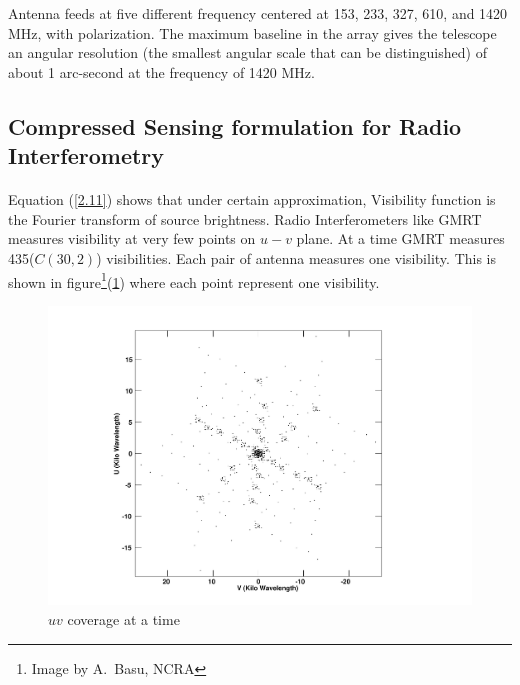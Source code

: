 Antenna feeds at five different frequency centered at 153, 233, 327, 610, and 1420 MHz, with polarization. 
The maximum baseline in the array gives the telescope an angular resolution 
(the smallest angular scale that can be distinguished) of about 1 arc-second at the frequency of 1420 MHz.


\subsection{Compressed Sensing formulation for Radio Interferometry}
\label{s:radio_cs}
\paragraph{}Equation (\ref{2.11}) shows that under certain approximation, Visibility function is the Fourier transform of
source brightness. Radio Interferometers like GMRT measures visibility at very few points on $u-v$ plane.
At a time GMRT measures 435($C(30,2)$) visibilities. Each pair of antenna measures one visibility. This is 
shown in figure\footnote{Image by A.\ Basu, NCRA}(\ref{Figattime}) where each point represent one visibility.
\begin{figure}[!htbp]
 \hspace*{-10em}
 \includegraphics[width=1.5\textwidth]{figures/attime}
 \caption{$uv$ coverage at a time}
 \label{Figattime}
\end{figure}

